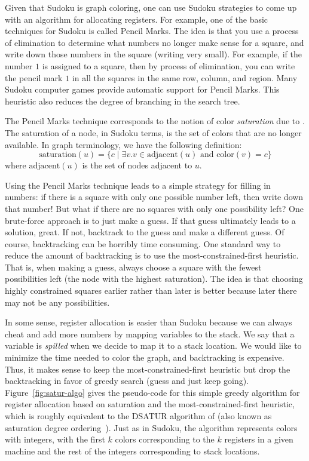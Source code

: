 \documentclass[11pt]{book}
\begin{document}
Given that Sudoku is graph coloring, one can use Sudoku strategies to
come up with an algorithm for allocating registers. For example, one
of the basic techniques for Sudoku is called Pencil Marks. The idea is
that you use a process of elimination to determine what numbers no
longer make sense for a square, and write down those numbers in the
square (writing very small). For example, if the number $1$ is
assigned to a square, then by process of elimination, you can write
the pencil mark $1$ in all the squares in the same row, column, and
region. Many Sudoku computer games provide automatic support for
Pencil Marks. This heuristic also reduces the degree of branching in
the search tree.

The Pencil Marks technique corresponds to the notion of color
\emph{saturation} due to \cite{Brelaz:1979eu}.  The saturation of a
node, in Sudoku terms, is the set of colors that are no longer
available. In graph terminology, we have the following definition:
\begin{equation*}
  \mathrm{saturation}(u) = \{ c \;|\; \exists v. v \in \mathrm{adjacent}(u) 
     \text{ and } \mathrm{color}(v) = c \}
\end{equation*}
where $\mathrm{adjacent}(u)$ is the set of nodes adjacent to $u$.

Using the Pencil Marks technique leads to a simple strategy for
filling in numbers: if there is a square with only one possible number
left, then write down that number! But what if there are no squares
with only one possibility left? One brute-force approach is to just
make a guess. If that guess ultimately leads to a solution, great.  If
not, backtrack to the guess and make a different guess.  Of course,
backtracking can be horribly time consuming. One standard way to
reduce the amount of backtracking is to use the most-constrained-first
heuristic. That is, when making a guess, always choose a square with
the fewest possibilities left (the node with the highest saturation).
The idea is that choosing highly constrained squares earlier rather
than later is better because later there may not be any possibilities.

In some sense, register allocation is easier than Sudoku because we
can always cheat and add more numbers by mapping variables to the
stack. We say that a variable is \emph{spilled} when we decide to map
it to a stack location. We would like to minimize the time needed to
color the graph, and backtracking is expensive. Thus, it makes sense
to keep the most-constrained-first heuristic but drop the backtracking
in favor of greedy search (guess and just keep going).
Figure~\ref{fig:satur-algo} gives the pseudo-code for this simple
greedy algorithm for register allocation based on saturation and the
most-constrained-first heuristic, which is roughly equivalent to the
DSATUR algorithm of \cite{Brelaz:1979eu} (also known as saturation
degree ordering~\citep{Gebremedhin:1999fk,Omari:2006uq}).  Just
as in Sudoku, the algorithm represents colors with integers, with the
first $k$ colors corresponding to the $k$ registers in a given machine
and the rest of the integers corresponding to stack locations.
\end{document}
